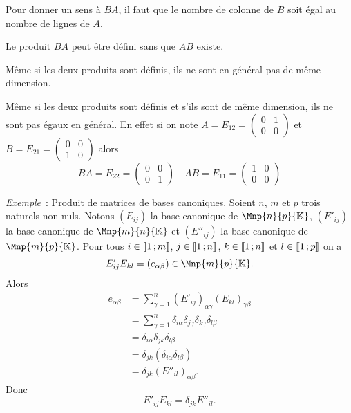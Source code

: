 \danger Pour donner un sens à $BA$, il faut que le nombre de colonne de $B$ soit égal au nombre de lignes de $A$.

\danger Le produit $BA$ peut être défini sans que $AB$ existe.

\danger Même si les deux produits sont définis, ils ne sont en général pas de même dimension.

\danger Même si les deux produits sont définis et s'ils sont de même dimension, ils ne sont pas égaux en général. En effet si on note $A=E_{12}=\begin{pmatrix} 0 & 1 \\ 0 & 0 \end{pmatrix}$ et $B=E_{21}=\begin{pmatrix} 0 & 0 \\ 1 & 0 \end{pmatrix}$ alors
\begin{equation}
  BA = E_{22} = \begin{pmatrix} 0 & 0 \\ 0 & 1 \end{pmatrix} \quad AB = E_{11} = \begin{pmatrix} 1 & 0 \\ 0 & 0 \end{pmatrix}
\end{equation}


\emph{Exemple}~: Produit de matrices de bases canoniques. Soient $n$, $m$ et $p$ trois naturels non nuls. Notons $(E_{ij})$ la base canonique de $\Mnp{n}{p}{\K}$, $(E'_{ij})$ la base canonique de $\Mnp{m}{n}{\K}$ et $(E''_{ij})$ la base canonique de $\Mnp{m}{p}{\K}$. Pour tous $i \in \mathopen{\llbracket}1\mathclose{}\mathpunct{};m\mathclose{\rrbracket}$, $j \in \mathopen{\llbracket}1\mathclose{}\mathpunct{};n\mathclose{\rrbracket}$, $k \in \mathopen{\llbracket}1\mathclose{}\mathpunct{};n\mathclose{\rrbracket}$ et $l \in \mathopen{\llbracket}1\mathclose{}\mathpunct{};p\mathclose{\rrbracket}$ on a
\begin{equation}
  E'_{ij} E_{kl} =(e_{\alpha \beta}) \in \Mnp{m}{p}{\K}.
\end{equation}
Alors
\begin{align}
  e_{\alpha \beta} &=\sum_{\gamma=1}^n (E'_{ij})_{\alpha \gamma} (E_{kl})_{\gamma \beta}\\
  &=\sum_{\gamma=1}^n \delta_{i\alpha} \delta_{j\gamma} \delta_{k\gamma} \delta_{l\beta} \\
  &= \delta_{i\alpha} \delta_{jk} \delta_{l\beta}\\
  &= \delta_{jk} (\delta_{i\alpha} \delta_{l\beta})\\
  &= \delta_{jk} (E''_{il})_{\alpha\beta}.
\end{align}
Donc
\begin{equation}
  E'_{ij} E_{kl} = \delta_{jk} E''_{il}.
\end{equation}


